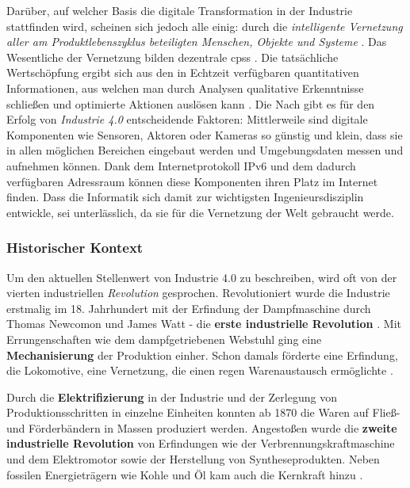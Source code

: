 Darüber, auf welcher Basis die digitale Transformation in der Industrie stattfinden wird, scheinen sich jedoch alle einig: durch die \textit{intelligente Vernetzung aller am Produktlebenszyklus beteiligten Menschen, Objekte und Systeme} \citep{Roth2016}. Das Wesentliche der Vernetzung bilden dezentrale \acf{cpss} \citep{Bendel2019a}. Die tatsächliche Wertschöpfung ergibt sich aus den in Echtzeit verfügbaren quantitativen Informationen, aus welchen man durch Analysen qualitative Erkenntnisse schließen und optimierte Aktionen auslösen kann \citep{Hnisch2017}. Die  Nach \cite{Sendler2016} gibt es für den Erfolg von \textit{Industrie 4.0} entscheidende Faktoren: Mittlerweile sind digitale Komponenten wie Sensoren, Aktoren oder Kameras so günstig und klein, dass sie in allen möglichen Bereichen eingebaut werden und Umgebungsdaten messen und aufnehmen können. Dank dem Internetprotokoll IPv6 und dem dadurch verfügbaren Adressraum können diese Komponenten ihren Platz im Internet finden. Dass die Informatik sich damit zur wichtigsten Ingenieursdisziplin entwickle, sei unterlässlich, da sie für die Vernetzung der Welt gebraucht werde.

\subsubsection{Historischer Kontext}

Um den aktuellen Stellenwert von Industrie 4.0 zu beschreiben, wird oft von der vierten industriellen \textit{Revolution} gesprochen. Revolutioniert wurde die Industrie erstmalig im 18. Jahrhundert mit der Erfindung der Dampfmaschine durch Thomas Newcomon und James Watt - die \textbf{erste industrielle Revolution} \citep{Roth2016}. Mit Errungenschaften wie dem dampfgetriebenen Webstuhl ging eine \textbf{Mechanisierung }der Produktion einher. Schon damals förderte eine Erfindung, die Lokomotive, eine Vernetzung, die einen regen Warenaustausch ermöglichte \citep{Barthelmaes2017}.

Durch die \textbf{Elektrifizierung} in der Industrie und der Zerlegung von Produktionsschritten in einzelne Einheiten konnten ab 1870 die Waren auf Fließ- und Förderbändern in Massen produziert werden. Angestoßen wurde die \textbf{zweite industrielle Revolution} von Erfindungen wie der Verbrennungskraftmaschine und dem Elektromotor sowie der Herstellung von Syntheseprodukten. Neben fossilen Energieträgern wie Kohle und Öl kam auch die Kernkraft hinzu \citep{Barthelmaes2017}.



